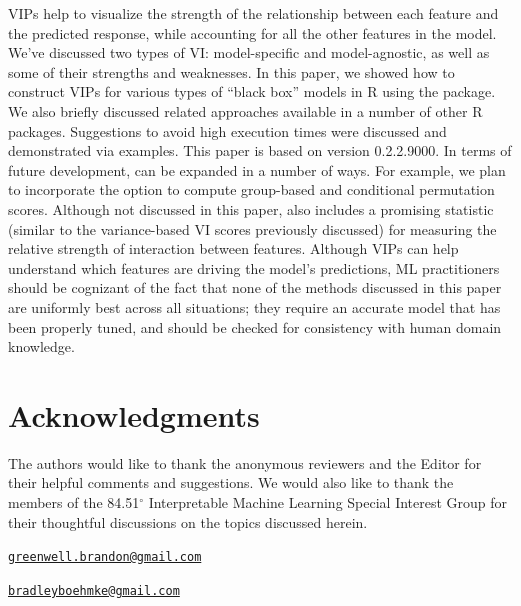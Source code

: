 VIPs help to visualize the strength of the relationship between each
feature and the predicted response, while accounting for all the other
features in the model. We've discussed two types of VI: model-specific
and model-agnostic, as well as some of their strengths and weaknesses.
In this paper, we showed how to construct VIPs for various types of
``black box'' models in R using the  package. We also briefly
discussed related approaches available in a number of other R packages.
Suggestions to avoid high execution times were discussed and
demonstrated via examples. This paper is based on  version
0.2.2.9000. In terms of future development,  can be expanded in
a number of ways. For example, we plan to incorporate the option to
compute group-based and conditional permutation scores. Although not
discussed in this paper,  also includes a promising statistic
(similar to the variance-based VI scores previously discussed) for
measuring the relative strength of interaction between features.
Although VIPs can help understand which features are driving the model's
predictions, ML practitioners should be cognizant of the fact that none
of the methods discussed in this paper are uniformly best across all
situations; they require an accurate model that has been properly tuned,
and should be checked for consistency with human domain knowledge.

\section{Acknowledgments}

The authors would like to thank the anonymous reviewers and the Editor
for their helpful comments and suggestions. We would also like to thank
the members of the 84.51\(^{\circ}\) Interpretable Machine Learning
Special Interest Group for their thoughtful discussions on the topics
discussed herein.




\address{%
Brandon M. Greenwell\\
University of Cincinnati\\
2925 Campus Green Dr\\ Cincinnati, OH 45221\\ United States of America\\ ORCiD---\href{https://orcid.org/0000-0002-8120-0084}{0000-0002-8120-0084}\\
}
\href{mailto:greenwell.brandon@gmail.com}{\nolinkurl{greenwell.brandon@gmail.com}}

\address{%
Bradley C. Boehmke\\
University of Cincinnati\\
2925 Campus Green Dr\\ Cincinnati, OH 45221\\ United States of America\\ ORCiD---\href{https://orcid.org/0000-0002-3611-8516}{0000-0002-3611-8516}\\
}
\href{mailto:bradleyboehmke@gmail.com}{\nolinkurl{bradleyboehmke@gmail.com}}

